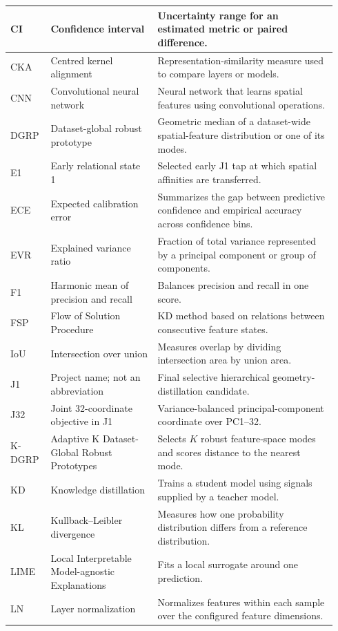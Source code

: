 \begin{longtable}{@{}L{0.11\linewidth}L{0.31\linewidth}L{0.52\linewidth}@{}}
CI & Confidence interval & Uncertainty range for an estimated metric or paired difference.\\ \midrule
CKA & Centred kernel alignment & Representation-similarity measure used to compare layers or models.\\ \midrule
CNN & Convolutional neural network & Neural network that learns spatial features using convolutional operations.\\ \midrule
DGRP & Dataset-global robust prototype & Geometric median of a dataset-wide spatial-feature distribution or one of its modes.\\ \midrule
E1 & Early relational state 1 & Selected early J1 tap at which spatial affinities are transferred.\\ \midrule
ECE & Expected calibration error & Summarizes the gap between predictive confidence and empirical accuracy across confidence bins.\\ \midrule
EVR & Explained variance ratio & Fraction of total variance represented by a principal component or group of components.\\ \midrule
F1 & Harmonic mean of precision and recall & Balances precision and recall in one score.\\ \midrule
FSP & Flow of Solution Procedure & KD method based on relations between consecutive feature states.\\ \midrule
IoU & Intersection over union & Measures overlap by dividing intersection area by union area.\\ \midrule
J1 & Project name; not an abbreviation & Final selective hierarchical geometry-distillation candidate.\\ \midrule
J32 & Joint 32-coordinate objective in J1 & Variance-balanced principal-component coordinate over PC1--32.\\ \midrule
K-DGRP & Adaptive K Dataset-Global Robust Prototypes & Selects $K$ robust feature-space modes and scores distance to the nearest mode.\\ \midrule
KD & Knowledge distillation & Trains a student model using signals supplied by a teacher model.\\ \midrule
KL & Kullback--Leibler divergence & Measures how one probability distribution differs from a reference distribution.\\ \midrule
LIME & Local Interpretable Model-agnostic Explanations & Fits a local surrogate around one prediction.\\ \midrule
LN & Layer normalization & Normalizes features within each sample over the configured feature dimensions.\\ \midrule

\end{longtable}
